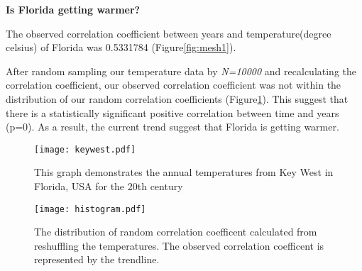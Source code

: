 \documentclass[12pt]{article}
\begin{document}
\textbf{Is Florida getting warmer?}





The observed correlation coefficient between years and temperature(degree celsius) of Florida was 0.5331784 (Figure\ref{fig:mesh1}).





After random sampling our temperature data by \textit{N=10000} and recalculating the correlation coefficient, our observed correlation coefficient was not within the distribution of our random correlation coefficients (Figure\ref{fig:mesh2}). This suggest that there is a 
statistically significant positive correlation between time and years (p=0). As a result, the current trend suggest that Florida is getting warmer. 

    \begin{figure}[H]
    \centering
    \begin{minipage}{.5\textwidth}
        \texttt{[image: keywest.pdf]}
        \centering
        \caption{This graph demonstrates the annual temperatures from Key West in Florida, USA for the 20th century}
        \label{fig:mesh1}
    \end{minipage}%
    \begin{minipage}{.5\textwidth}
        \texttt{[image: histogram.pdf]}
        \centering
        \caption{The distribution of random correlation coefficent calculated from reshuffling the temperatures. The observed correlation coefficent is represented by the trendline.}
        \label{fig:mesh2}
    \end{minipage}
    \end{figure}
\end{document}
